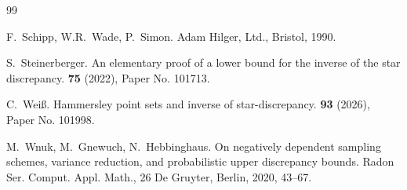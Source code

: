 \documentclass[12pt]{article}
\theoremstyle{definition}
\numberwithin{equation}{section}
\begin{document}
\begin{thebibliography}{99}



F.~Schipp, W.R.~Wade, P.~Simon. 
\newblock Adam Hilger, Ltd., Bristol, 1990.


S.~Steinerberger.
\newblock An elementary proof of a lower bound for the inverse of the star discrepancy.
 \textbf{75} (2022), Paper No. 101713.

C.~Wei{\ss}.
\newblock Hammersley point sets and inverse of star-discrepancy.
 \textbf{93} (2026), Paper No. 101998.

M.~Wnuk, M.~Gnewuch, N.~Hebbinghaus.
\newblock On negatively dependent sampling schemes, variance reduction, and probabilistic upper discrepancy bounds.
\newblock Radon Ser. Comput. Appl. Math., 26 De Gruyter, Berlin, 2020, 43--67.

\end{thebibliography}
\end{document}
